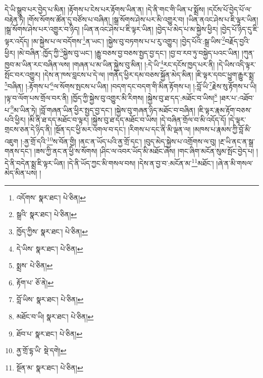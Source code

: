 དེ་ཡི་སྒྲུབ་པར་བྱེད་པ་མིན། །རྟོགས་པ་ངེས་པར་རྟོགས་ཡིན་ན། །དེ་ནི་གང་གི་ཡིན་པ་སྨྲོས། །དངོས་པོ་བྱེད་པོ་ལ་བརྟེན་ཏེ། །གོས་སོགས་ཚོན་དུ་བཙོས་པ་བཞིན། །སྒྲ་སོགས་ཤེས་པར་མི་འགྱུར་བ། །ཡིན་ནའང་ཤེས་པ་ཇི་ལྟར་ཡིན། །སྒྲ་སོགས་ཤེས་པར་འགྱུར་བ་ཉིད། །ཡིན་ནའང་ཤེས་པ་ཇི་ལྟར་ཡིན། །བྱེད་པ་མེད་པ་མ་སྐྱེས་ཕྱིར། །བྱེད་པོ་ཉིད་དུ་ཇི་ལྟར་འདོད། །མ་སྐྱེས་པ་ལ་བདོགས་\footnote{འདོགས་  སྣར་ཐང་།  པེ་ཅིན། }ན་ཡང་། །སྐྱེས་བུ་བཏགས་པ་པ་རུ་འགྱུར། །བྱེད་པོའི་:སྒྲ་ཡིས་\footnote{སྒྲའི་  སྣར་ཐང་།  པེ་ཅིན། }བརྗོད་བྱའི་ཕྱིར། །མེ་བཞིན་:ཁྱོད་ཀྱི་\footnote{ཁྱོད་ཀྱིས་  སྣར་ཐང་།  པེ་ཅིན། }སྐྱེས་བུ་ཡང་། །རྒྱུ་བཅས་བྱ་བཅས་སྤྱད་བྱ་དང་། །བྱ་བ་རབ་ཏུ་བསྐྱེད་པའང་ཡིན། །ཀུན་ཁྱབ་མ་ཡིན་རང་བཞིན་ལས། །གཞན་པ་མ་ཡིན་སྐྱེས་བུ་མིན། །:དེ་ཡི་\footnote{དེ་ཡིས་  སྣར་ཐང་།  པེ་ཅིན། }རང་དངོས་ཁྱད་པར་ནི། །དེ་ཡིས་འདི་ལྟར་སྤོང་བར་འགྱུར། །དེས་ན་ཁས་བླངས་པ་དེ་ལ། །གནོད་ཕྱིར་དམ་བཅས་སྐྱོན་མེད་མིན། །ཇི་ལྟར་དབང་ཕྱུག་རྒྱུར་སྨྲ་\footnote{སྨྲས་  པེ་ཅིན། }བཞིན། །:རྟོགས་པ་\footnote{རྟོག་པ་  ཅོ་ནེ། }ལ་སོགས་སྤངས་པ་ཡིན། །བདག་དང་བདག་གི་མིན་རྟོགས་པ། །:བློ་ཡི་\footnote{བློ་ཡིས་  སྣར་ཐང་།  པེ་ཅིན། }རྗེས་སུ་རྟོགས་པ་ཡི། །ལྟ་བ་ལོག་པས་གྲོལ་བར་ནི། །ཁྱོད་ཀྱི་སྐྱེས་བུ་འགྱུར་མི་རིགས། །སྐྱེས་བུ་ཐ་དད་:མཐོང་བ་ཡིས།\footnote{མཐོང་བ་ཡི།  སྣར་ཐང་།  པེ་ཅིན། } །ཐར་པ་:འཐོབ་པ་\footnote{ཐོབ་པ་  སྣར་ཐང་།  པེ་ཅིན། }མ་ཡིན་ཏེ། །བློ་གཞན་ཡིན་ཕྱིར་སྤྱད་བྱ་དང་། །སྐྱེས་བུ་གཞན་ཉིད་མཐོང་བ་བཞིན། །ཇི་ལྟར་རྣམ་རྟོག་བཅས་པའི་ཕྱིར། །མི་ནི་ཐ་དད་མཐོང་བ་ལྟར། །སྐྱེས་བུ་ཐ་དད་མཐོང་བ་ཡིས། །དེ་བཞིན་གྲོལ་བ་མི་འདོད་དོ། །དེ་ལྟར་གྲངས་ཅན་དེ་ཉིད་ནི། །སྔོན་དང་ཕྱི་མར་འགལ་བ་དང་། །རིགས་པ་དང་ནི་མི་ལྡན་ལ། །མཁས་པ་རྣམས་ཀྱི་བློ་མི་འཇུག །:ནྱ་གྲོ་དའི་\footnote{ནྱ་གྲོ་དྷ་ཡི་  སྡེ་དགེ། }ས་བོན་གྱི། །ནང་ན་ཡོད་པའི་ནྱ་གྲོ་དང་། །བུད་མེད་སྐྱེས་པ་འགྲོགས་ལ་བུ། །རྔ་ཡི་ནང་ན་སྒྲ་གནས་དང་། །ཟས་ཀྱི་ནང་ན་ཕྱི་ས་སོགས། །ཤིང་ལ་འབར་ཡོད་མི་མཐོང་ཞེས། །གང་ཞིག་མངོན་སུམ་སྤོང་བྱེད་པ། །དེ་ནི་བདེན་སྨྲ་ཇི་ལྟར་ཡིན། །དེ་ནི་ཡོད་ཀྱང་མི་གསལ་བས། །དེས་ན་བྱ་བ་:མངོན་མ་\footnote{སྔོན་མ་  སྣར་ཐང་།  པེ་ཅིན། }མཐོང་། །ཞེ་ན་མི་གསལ་མེད་མིན་པས། །
